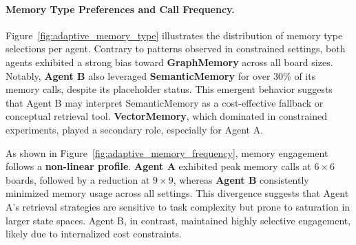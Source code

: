 \documentclass[10pt]{article}
\begin{document}
\paragraph{Memory Type Preferences and Call Frequency.}
Figure~\ref{fig:adaptive_memory_type} illustrates the distribution of memory type selections per agent. Contrary to patterns observed in constrained settings, both agents exhibited a strong bias toward \textbf{GraphMemory} across all board sizes. Notably, \textbf{Agent B} also leveraged \textbf{SemanticMemory} for over 30\% of its memory calls, despite its placeholder status. This emergent behavior suggests that Agent B may interpret SemanticMemory as a cost-effective fallback or conceptual retrieval tool. \textbf{VectorMemory}, which dominated in constrained experiments, played a secondary role, especially for Agent A.

As shown in Figure~\ref{fig:adaptive_memory_frequency}, memory engagement follows a \textbf{non-linear profile}. \textbf{Agent A} exhibited peak memory calls at $6\times6$ boards, followed by a reduction at $9\times9$, whereas \textbf{Agent B} consistently minimized memory usage across all settings. This divergence suggests that Agent A's retrieval strategies are sensitive to task complexity but prone to saturation in larger state spaces. Agent B, in contrast, maintained highly selective engagement, likely due to internalized cost constraints.
\end{document}
